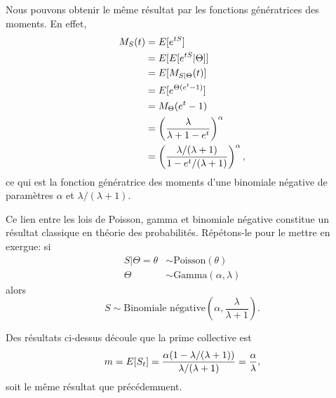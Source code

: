 \begin{exemple}
\begin{enumerate}[a)]
    Nous pouvons obtenir le même résultat par les fonctions
    génératrices des moments. En effet,
    \begin{align*}
      M_S(t)
      &= E [ e^{t S} ] \\
      &= E [ E [ e^{t S}|\Theta ] ] \\
      &= E [ M_{S|\Theta}(t) ] \\
      &= E [ e^{\Theta (e^t - 1)} ] \\
      &= M_\Theta(e^t - 1) \\
      &=
      \left(
        \frac{\lambda}{\lambda + 1 - e^t}
      \right)^\alpha \\
      &=
      \left(
        \frac{\lambda/(\lambda + 1)}{1 - e^t/(\lambda + 1)}
      \right)^\alpha,
    \end{align*}
    ce qui est la fonction génératrice des moments d'une binomiale
    négative de paramètres $\alpha$ et $\lambda/(\lambda + 1)$.

    Ce lien entre les lois de Poisson, gamma et binomiale négative
    constitue un résultat classique en théorie des probabilités.
    Répétons-le pour le mettre en exergue: si
    \begin{align*}
      S|\Theta = \theta &\sim \text{Poisson}(\theta) \\
      \Theta &\sim \text{Gamma}(\alpha, \lambda)
    \end{align*}
    alors
    \begin{equation*}
      S \sim \text{Binomiale négative}
      \left(
        \alpha, \frac{\lambda}{\lambda + 1}
      \right).
    \end{equation*}

    Des résultats ci-dessus découle que la prime collective est
    \begin{equation*}
      m = E [ S_t ] = \frac{\alpha (1 - \lambda/(\lambda + 1))}{\lambda/(\lambda
      + 1)} = \frac{\alpha}{\lambda},
    \end{equation*}
    soit le même résultat que précédemment.


\end{enumerate}
\end{exemple}
